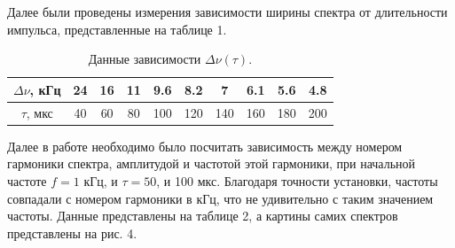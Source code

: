 \documentclass[a4paper, 14pt]{extarticle}%
\newcommand\ECaption[1]{%
     \captionsetup{font=footnotesize}%
     \caption{#1}}
\begin{document}
Далее были проведены измерения зависимости ширины спектра от длительности импульса, представленные на таблице 1.

\begin{table}[h]
\begin{center}
\begin{tabular}{|c|c|c|c|c|c|c|c|c|c|}
\hline
\rowcolor[HTML]{9698ED} 
$\Delta\nu$, кГц & 24 & 16 & 11 & 9.6 & 8.2 & 7   & 6.1 & 5.6 & 4.8 \\ \hline
$\tau$, мкс      & 40 & 60 & 80 & 100 & 120 & 140 & 160 & 180 & 200 \\ \hline
\end{tabular}

\end{center}
\ECaption{Данные зависимости $\Delta\nu(\tau)$. }
\end{table} 

Далее в работе необходимо было посчитать зависимость между номером гармоники спектра, амплитудой и частотой этой гармоники, при начальной частоте $f = 1$ кГц, и $\tau = 50 $, и 100 мкс. Благодаря точности установки, частоты совпадали с номером гармоники в кГц, что не удивительно с таким значением частоты. Данные представлены на таблице 2, а картины самих спектров представлены на рис. 4. 
\end{document}
